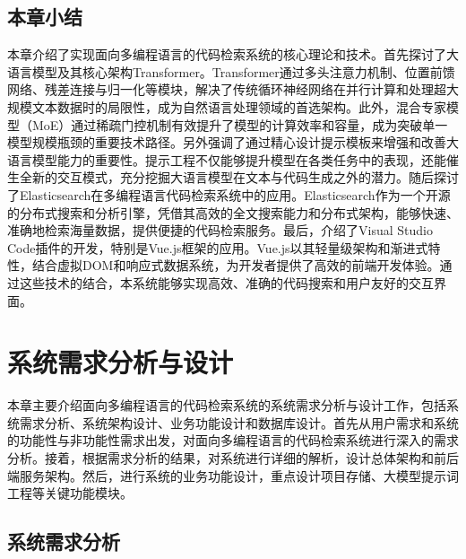 \documentclass[UTF8,a4paper,12pt]{ctexart}
\numberwithin{equation}{section}
\begin{document}
\subsection{本章小结}
本章介绍了实现面向多编程语言的代码检索系统的核心理论和技术。首先探讨了大语言模型及其核心架构Transformer。Transformer通过多头注意力机制、位置前馈网络、残差连接与归一化等模块，解决了传统循环神经网络在并行计算和处理超大规模文本数据时的局限性，成为自然语言处理领域的首选架构。此外，混合专家模型（MoE）通过稀疏门控机制有效提升了模型的计算效率和容量，成为突破单一模型规模瓶颈的重要技术路径。另外强调了通过精心设计提示模板来增强和改善大语言模型能力的重要性。提示工程不仅能够提升模型在各类任务中的表现，还能催生全新的交互模式，充分挖掘大语言模型在文本与代码生成之外的潜力。随后探讨了Elasticsearch在多编程语言代码检索系统中的应用。Elasticsearch作为一个开源的分布式搜索和分析引擎，凭借其高效的全文搜索能力和分布式架构，能够快速、准确地检索海量数据，提供便捷的代码检索服务。最后，介绍了Visual Studio Code插件的开发，特别是Vue.js框架的应用。Vue.js以其轻量级架构和渐进式特性，结合虚拟DOM和响应式数据系统，为开发者提供了高效的前端开发体验。通过这些技术的结合，本系统能够实现高效、准确的代码搜索和用户友好的交互界面。

\newpage
{}

\section{系统需求分析与设计}
本章主要介绍面向多编程语言的代码检索系统的系统需求分析与设计工作，包括系统需求分析、系统架构设计、业务功能设计和数据库设计。首先从用户需求和系统的功能性与非功能性需求出发，对面向多编程语言的代码检索系统进行深入的需求分析。接着，根据需求分析的结果，对系统进行详细的解析，设计总体架构和前后端服务架构。然后，进行系统的业务功能设计，重点设计项目存储、大模型提示词工程等关键功能模块。
\subsection{系统需求分析}
\end{document}
